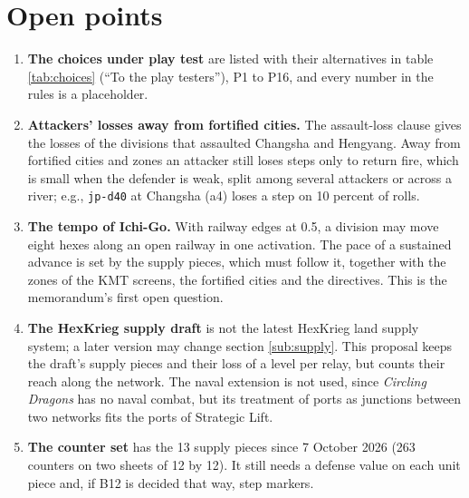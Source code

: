 \documentclass[11pt]{article}
\begin{document}
\section{Open points}\label{sec:open}
\begin{enumerate}
\item \textbf{The choices under play test} are listed with their alternatives in table \ref{tab:choices} (``To the play testers''), P1 to P16, and every number in the rules is a placeholder.
\item \textbf{Attackers' losses away from fortified cities.} The assault-loss clause gives the losses of the divisions that assaulted Changsha and Hengyang. Away from fortified cities and zones an attacker still loses steps only to return fire, which is small when the defender is weak, split among several attackers or across a river; e.g., \texttt{jp-d40} at Changsha (a4) loses a step on 10 percent of rolls.
\item \textbf{The tempo of Ichi-Go.} With railway edges at 0.5, a division may move eight hexes along an open railway in one activation. The pace of a sustained advance is set by the supply pieces, which must follow it, together with the zones of the KMT screens, the fortified cities and the directives. This is the memorandum's first open question.
\item \textbf{The HexKrieg supply draft} is not the latest HexKrieg land supply system; a later version may change section \ref{sub:supply}. This proposal keeps the draft's supply pieces and their loss of a level per relay, but counts their reach along the network. The naval extension is not used, since \emph{Circling Dragons} has no naval combat, but its treatment of ports as junctions between two networks fits the ports of Strategic Lift.
\item \textbf{The counter set} has the 13 supply pieces since 7 October 2026 (263 counters on two sheets of 12 by 12). It still needs a defense value on each unit piece and, if B12 is decided that way, step markers.
\end{enumerate}
\end{document}

